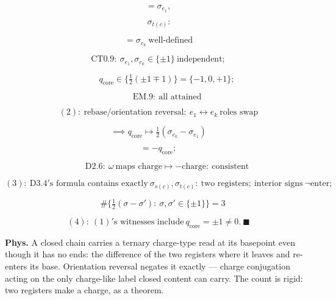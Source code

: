 \begin{theorem}
\[
= \sigma_{e_1},
\]

\[
\ \sigma_{t(c)}:
\]

\[
= \sigma_{e_k}\ \text{well-defined}
\]

\[
\mathrm{CT0.9}:\ \sigma_{e_1},\sigma_{e_k}\in\{\pm1\}\ \text{independent};
\]

\[
\qquad q_{\mathrm{core}}\in\{\tfrac12(\pm1\mp1)\}=\{-1,0,+1\};
\]

\[
\qquad \mathrm{EM.9}:\ \text{all attained}
\]

\[
(2):\ \text{rebase/orientation reversal}:\ e_1\leftrightarrow e_k\ \text{roles swap}
\]

\[
\implies q_{\mathrm{core}}\mapsto\tfrac12(\sigma_{e_k}-\sigma_{e_1})
\]

\[
= -q_{\mathrm{core}};
\]

\[
\qquad \mathrm{D2.6}:\ \omega\ \text{maps charge}\mapsto-\text{charge}:\ \text{consistent}
\]

\[
(3):\ \mathrm{D3.4}'\text{s formula contains exactly}\ \sigma_{s(c)},\sigma_{t(c)}:\ \text{two registers};\ \text{interior signs}\ \neg\text{enter};
\]

\[
\quad \#\{\tfrac12(\sigma-\sigma'):\ \sigma,\sigma'\in\{\pm1\}\}=3
\]

\[
(4):\ (1)'\text{s witnesses include}\ q_{\mathrm{core}}=\pm1\ne0.\ \blacksquare
\]

\textbf{Phys.} A closed chain carries a ternary charge-type read at its basepoint even though it has no ends: the difference of the two registers where it leaves and re-enters its base. Orientation reversal negates it exactly — charge conjugation acting on the only charge-like label closed content can carry. The count is rigid: two registers make a charge, as a theorem.

\end{theorem}

